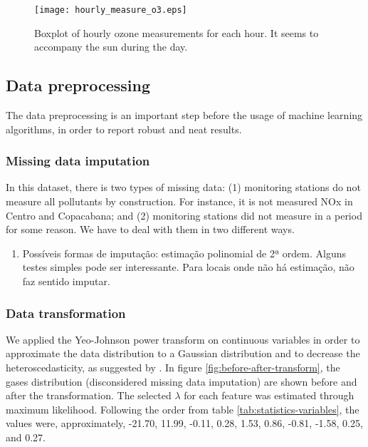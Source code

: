 \begin{figure}[H]
    \begin{center}
        \texttt{[image: hourly\_measure\_o3.eps]}
    \end{center}
    \caption{Boxplot of hourly ozone measurements for each hour. It seems to accompany the sun during the day. }
    \label{fig:hourly-boxplot-ozone}
\end{figure}


\subsection{Data preprocessing}
\label{sec:data-preprocessing}

The data preprocessing is an important step before the usage of machine
learning algorithms, in order to report robust and neat results. 

\subsubsection{Missing data imputation}

In this dataset, there is two types of missing data: (1) monitoring stations
do not measure all pollutants by construction. For instance, it is not
measured NOx in Centro and Copacabana; and (2) monitoring stations did not
measure in a period for some reason. We have to deal with them in two
different ways. 

\begin{enumerate}
    \item Possíveis formas de imputação: estimação polinomial de 2ª ordem.
    Alguns testes simples pode ser interessante. Para locais onde não há
    estimação, não faz sentido imputar. 
\end{enumerate}

\subsubsection{Data transformation}

We applied the Yeo-Johnson power transform \cite{yeo2000} on continuous
variables in order to approximate the data distribution to a Gaussian
distribution and to
decrease the heteroscedasticity, as suggested by \cite{gocheva2014}. In figure
\ref{fig:before-after-transform}, the gases distribution (disconsidered
missing data imputation) are shown before and after the transformation. The
selected $\lambda$ for each feature was estimated through maximum likelihood.
Following the order from table \ref{tab:statistics-variables}, the values
were, approximately, 
-21.70,  11.99, -0.11, 0.28, 1.53, 0.86, -0.81, -1.58, 0.25, and 0.27. 

